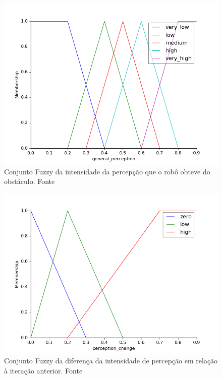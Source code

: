 \documentclass[twoside,conference,a4paper]{IEEEtran}
\begin{document}
\begin{figure}[ht!]
  \centering
  \includegraphics[width=1\hsize]{figuras/per.png}
  \caption{Conjunto Fuzzy da intensidade da percepção que o robô obteve do obstáculo. Fonte \cite{Reinhard:1995}}
  \label{fig:fig2}
\end{figure}

\begin{figure}[ht!]
  \centering
  \includegraphics[width=1\hsize]{figuras/per_change.png}
  \caption{Conjunto Fuzzy da diferença da intensidade de percepção em relação à iteração anterior. Fonte \cite{Reinhard:1995}}
  \label{fig:fig3}
\end{figure}
\end{document}

